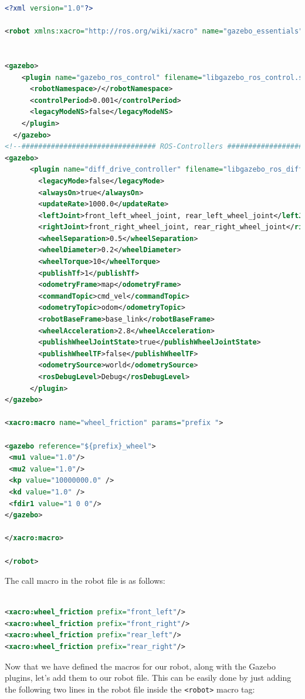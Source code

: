 \documentclass[letterpaper,pdftex]{article}
\begin{document}
\begin{lstlisting}[language=xml]
<?xml version="1.0"?>

<robot xmlns:xacro="http://ros.org/wiki/xacro" name="gazebo_essentials" >


<gazebo>
    <plugin name="gazebo_ros_control" filename="libgazebo_ros_control.so">
      <robotNamespace>/</robotNamespace>
      <controlPeriod>0.001</controlPeriod>
      <legacyModeNS>false</legacyModeNS>
    </plugin>
  </gazebo>
<!--################################ ROS-Controllers ######################################-->
<gazebo>
      <plugin name="diff_drive_controller" filename="libgazebo_ros_diff_drive.so">
        <legacyMode>false</legacyMode>
        <alwaysOn>true</alwaysOn>
        <updateRate>1000.0</updateRate>
        <leftJoint>front_left_wheel_joint, rear_left_wheel_joint</leftJoint>
        <rightJoint>front_right_wheel_joint, rear_right_wheel_joint</rightJoint>
        <wheelSeparation>0.5</wheelSeparation>
        <wheelDiameter>0.2</wheelDiameter>
        <wheelTorque>10</wheelTorque>
        <publishTf>1</publishTf>
        <odometryFrame>map</odometryFrame>
        <commandTopic>cmd_vel</commandTopic>
        <odometryTopic>odom</odometryTopic>
        <robotBaseFrame>base_link</robotBaseFrame>
        <wheelAcceleration>2.8</wheelAcceleration>
        <publishWheelJointState>true</publishWheelJointState>
        <publishWheelTF>false</publishWheelTF>
        <odometrySource>world</odometrySource>
        <rosDebugLevel>Debug</rosDebugLevel>
      </plugin>
</gazebo>

<xacro:macro name="wheel_friction" params="prefix ">

<gazebo reference="${prefix}_wheel">
 <mu1 value="1.0"/>
 <mu2 value="1.0"/>
 <kp value="10000000.0" />
 <kd value="1.0" />
 <fdir1 value="1 0 0"/>
</gazebo>

</xacro:macro>

</robot>
\end{lstlisting}

The call macro in the robot file is as follows:

\begin{lstlisting}[language=xml]

<xacro:wheel_friction prefix="front_left"/>
<xacro:wheel_friction prefix="front_right"/>
<xacro:wheel_friction prefix="rear_left"/>
<xacro:wheel_friction prefix="rear_right"/>

\end{lstlisting}

Now that we have defined the macros for our robot, along with the Gazebo plugins, let's add them to our robot file. This can be easily done by just adding the following two lines in the robot file inside the \verb|<robot>| macro tag:
\end{document}
